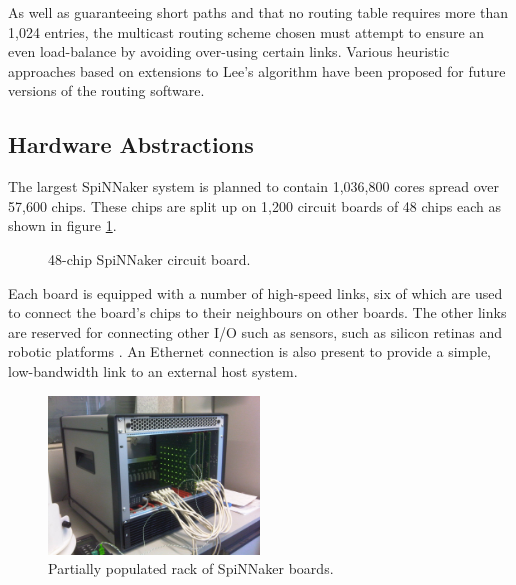				
				As well as guaranteeing short paths and that no routing table requires
				more than 1,024 entries, the multicast routing scheme chosen must
				attempt to ensure an even load-balance by avoiding over-using certain
				links. Various heuristic approaches based on extensions to Lee's
				algorithm have been proposed for future versions of the routing
				software\cite{davidson13}.
		
		\subsection{Hardware Abstractions}
			
			
			The largest SpiNNaker system is planned to contain 1,036,800 cores spread
			over 57,600 chips.  These chips are split up on 1,200 circuit boards of
			48 chips each as shown in figure \ref{fig:spinn4labelled}.
			
			\begin{figure}
				\center
				
				\caption{48-chip SpiNNaker circuit board.}
				\label{fig:spinn4labelled}
			\end{figure}
			
			Each board is equipped with a number of high-speed links, six of which are
			used to connect the board's chips to their neighbours on other boards. The
			other links are reserved for connecting other I/O such as sensors, such as
			silicon retinas and robotic platforms \cite{davies10}. An Ethernet
			connection is also present to provide a simple, low-bandwidth link to an
			external host system.
			
			\begin{figure}
				\center
				\includegraphics[width=0.5\textwidth]{figures/spiNNaker103.jpg}
				\caption{Partially populated rack of SpiNNaker boards.}
				\label{fig:spiNNaker103}
			\end{figure}
			
